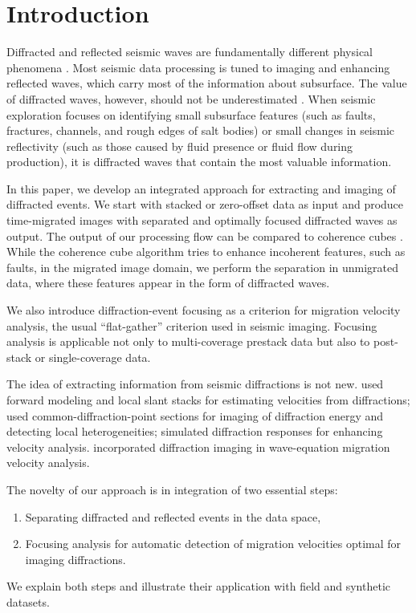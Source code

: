 \section{Introduction}

Diffracted and reflected seismic waves are
fundamentally different physical phenomena
\cite[]{TSD00-00-04090409}. Most  seismic data processing is tuned
to imaging and enhancing reflected waves, which carry
most of the information about subsurface. The value of
diffracted waves, however, should not be underestimated
\cite[]{GEO69-06-14781490}.  When seismic exploration focuses
on identifying small subsurface features (such as faults, fractures,
channels, and rough edges of salt bodies) or small changes in seismic
reflectivity (such as those caused by fluid presence or fluid flow
during  production), it is diffracted waves that
contain the most valuable information.

In this paper, we develop an integrated approach for extracting and
imaging of diffracted events. We start with stacked or zero-offset data
as input and produce time-migrated images with separated and optimally
focused diffracted waves as output. The output of our processing flow
can be compared to coherence cubes
\cite[]{TLE14-10-10531058,GEO63-04-11501165}. 
While the coherence cube algorithm tries to enhance incoherent
features, such as faults, in the migrated image domain, we perform the
separation in unmigrated data, where these features appear in the form
of diffracted waves.

We also introduce diffraction-event focusing as a criterion for
migration velocity analysis,  
the usual ``flat-gather'' criterion used in seismic imaging. Focusing
analysis is applicable not only to multi-coverage prestack data but
also to post-stack or single-coverage data.

The idea of extracting information from seismic diffractions is not
new. \cite{GEO49-11-18691880} used forward modeling and local slant
stacks for estimating velocities from
diffractions; \cite{GEO63-03-10931100} used common-diffraction-point
sections for imaging of diffraction energy and detecting local
heterogeneities; \cite{SEG-2002-22932296} simulated diffraction
responses for enhancing velocity analysis. \cite{sava} incorporated
diffraction imaging in wave-equation migration velocity analysis.

The novelty of our approach is in integration of two essential steps:
\begin{enumerate}
\item Separating diffracted and reflected events in the data space,
\item Focusing analysis for automatic detection of migration velocities optimal for imaging diffractions. 
\end{enumerate}
We explain both steps  and illustrate their
application with field and synthetic datasets.

